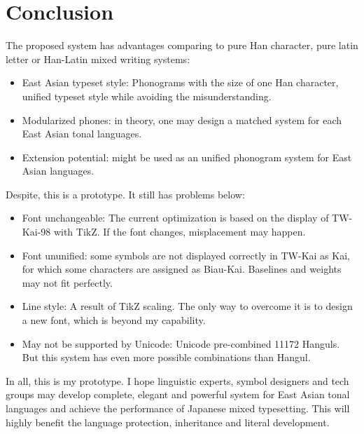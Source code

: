\section{Conclusion}
The proposed system has advantages comparing to pure Han character, pure latin letter or Han-Latin mixed writing systems: \par
\begin{itemize}
	\item East Asian typeset style: Phonograms with the size of one Han character, unified typeset style while avoiding the misunderstanding. 
	\item Modularized phones: in theory, one may design a matched system for each East Asian tonal languages. 
	\item Extension potential: might be used as an unified phonogram system for East Asian languages. 
\end{itemize}
Despite, this is a prototype. It still has problems below: 
\begin{itemize}
	\item Font unchangeable: The current optimization is based on the display of TW-Kai-98 with TikZ. If the font changes, misplacement may happen. 
	\item Font ununified: some symbols are not displayed correctly in TW-Kai as Kai, for which some characters are assigned as Biau-Kai. Baselines and weights may not fit perfectly. 
	\item Line style: A result of TikZ scaling. The only way to overcome it is to design a new font, which is beyond my capability. 
	\item May not be supported by Unicode: Unicode pre-combined 11172 Hanguls. But this system has even more possible combinations than Hangul. 
\end{itemize}
In all, this is my prototype. I hope linguistic experts, symbol designers and tech groups may develop complete, elegant and powerful system for East Asian tonal languages and achieve the performance of Japanese mixed typesetting. This will highly benefit the language protection, inheritance and literal development. 
\clearpage